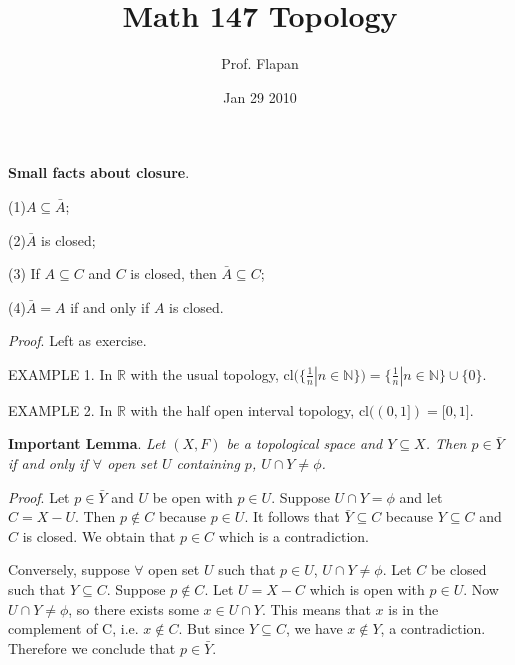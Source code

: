 \documentclass{article}
\title{Math 147 Topology}
\author{Prof. Flapan}
\date{Jan 29 2010}
\begin{document}
\maketitle

\noindent \textbf{Small facts about closure}. \vspace{2mm}

(1)$A \subseteq \bar{A}$; \vspace{2mm}

(2)$\bar{A}$ is closed;\vspace{2mm}

(3) If $A \subseteq C$ and $C$ is closed, then $\bar{A} \subseteq
C$; \vspace{2mm}

(4)$\bar{A}=A$ if and only if $A$ is closed. \vspace{2mm}

\noindent \textit{Proof}. Left as exercise.\vspace{4mm}

\noindent EXAMPLE 1. \quad In $\mathbb{R}$ with the usual topology,
$\mathrm{cl}(\lbrace \frac{1}{n}|n \in \mathbb{N} \rbrace) = \lbrace
\frac{1}{n}|n \in \mathbb{N} \rbrace \cup \lbrace 0
\rbrace$.\vspace{4mm}

\noindent EXAMPLE 2. \quad In $\mathbb{R}$ with the half open
interval topology, $\mathrm{cl}((0,1 \rbrack)=\lbrack 0, 1
\rbrack$.\vspace{6mm}

\noindent \textbf{Important Lemma}. \quad \textit{Let $(X,F)$ be a
topological space and $Y \subseteq X$. Then $ p \in \bar{Y}$ if and
only if $\forall$ open set $U$ containing $p$, $U \cap Y \neq
\phi$.}\vspace{2mm}

\noindent \textit{Proof}. \quad Let $p \in \bar{Y}$ and $U$ be open
with $p \in U$. Suppose $U \cap Y = \phi$ and let $C=X-U$. Then $p
\notin C$ because $p \in U$. It follows that $\bar{Y} \subseteq C$
because $Y \subseteq C$ and $C$ is closed. We obtain that $p \in C$
which is a contradiction.

Conversely, suppose $\forall$ open set $U$ such that $p \in U$, $U
\cap Y \neq \phi$. Let $C$ be closed such that $Y \subseteq C$.
Suppose $p \notin C$. Let $U=X-C$ which is open with $p \in U$. Now
$U \cap Y \neq \phi$, so there exists some $x \in U \cap Y$. This
means that $x$ is in the complement of C, i.e. $x \notin C$. But
since $Y \subseteq C$, we have $x \notin Y$, a contradiction.
Therefore we conclude that $p \in \bar{Y}$.\vspace{4mm}
\end{document}
